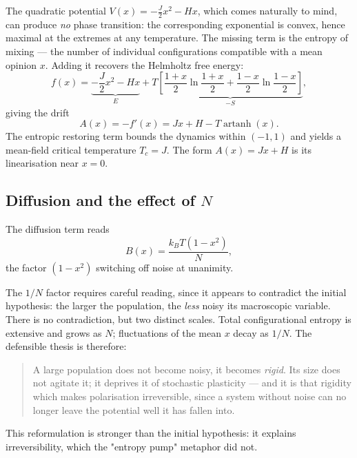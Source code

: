 \documentclass[11pt,a4paper]{article}
\begin{document}
The quadratic potential $V(x) = -\frac{J}{2}x^2 - Hx$, which comes naturally to mind, can
produce \emph{no} phase transition: the corresponding exponential is convex, hence maximal
at the extremes at any temperature. The missing term is the entropy of mixing --- the number
of individual configurations compatible with a mean opinion $x$. Adding it recovers the
Helmholtz free energy:
\begin{equation}
f(x) = \underbrace{-\frac{J}{2}x^2 - Hx}_{E}
+ T\underbrace{\left[\frac{1+x}{2}\ln\frac{1+x}{2}
+ \frac{1-x}{2}\ln\frac{1-x}{2}\right]}_{-S},
\label{eq:free}
\end{equation}
giving the drift
\begin{equation}
A(x) = -f'(x) = Jx + H - T\operatorname{artanh}(x).
\label{eq:drift}
\end{equation}
The entropic restoring term bounds the dynamics within $(-1,1)$ and yields a mean-field
critical temperature $T_c = J$. The form $A(x) = Jx + H$ is its linearisation near $x = 0$.

\subsection{Diffusion and the effect of $N$}

The diffusion term reads
\begin{equation}
B(x) = \frac{k_B T (1-x^2)}{N},
\label{eq:diffusion}
\end{equation}
the factor $(1-x^2)$ switching off noise at unanimity.

The $1/N$ factor requires careful reading, since it appears to contradict the initial
hypothesis: the larger the population, the \emph{less} noisy its macroscopic variable.
There is no contradiction, but two distinct scales. Total configurational entropy is
extensive and grows as $N$; fluctuations of the mean $x$ decay as $1/N$. The defensible
thesis is therefore:

\begin{quote}
A large population does not become noisy, it becomes \emph{rigid}. Its size does not
agitate it; it deprives it of stochastic plasticity --- and it is that rigidity which makes
polarisation irreversible, since a system without noise can no longer leave the potential
well it has fallen into.
\end{quote}

This reformulation is stronger than the initial hypothesis: it explains irreversibility,
which the "entropy pump" metaphor did not.
\end{document}
